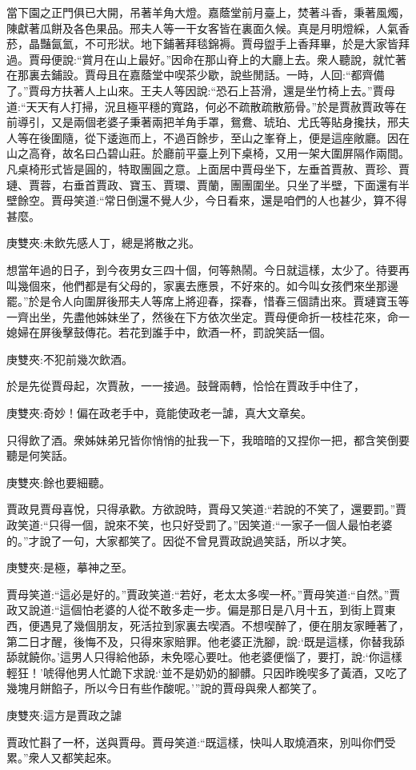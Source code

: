 \begin{parag}
    當下園之正門俱已大開，吊著羊角大燈。嘉蔭堂前月臺上，焚著斗香，秉著風燭，陳獻著瓜餅及各色果品。邢夫人等一干女客皆在裏面久候。真是月明燈綵，人氣香菸，晶豔氤氳，不可形狀。地下鋪著拜毯錦褥。賈母盥手上香拜畢，於是大家皆拜過。賈母便說:“賞月在山上最好。”因命在那山脊上的大廳上去。衆人聽說，就忙著在那裏去鋪設。賈母且在嘉蔭堂中喫茶少歇，說些閒話。一時，人回:“都齊備了。”賈母方扶著人上山來。王夫人等因說:“恐石上苔滑，還是坐竹椅上去。”賈母道:“天天有人打掃，況且極平穩的寬路，何必不疏散疏散筋骨。”於是賈赦賈政等在前導引，又是兩個老婆子秉著兩把羊角手罩，鴛鴦、琥珀、尤氏等貼身攙扶，邢夫人等在後圍隨，從下逶迤而上，不過百餘步，至山之峯脊上，便是這座敞廳。因在山之高脊，故名曰凸碧山莊。於廳前平臺上列下桌椅，又用一架大圍屏隔作兩間。凡桌椅形式皆是圓的，特取團圓之意。上面居中賈母坐下，左垂首賈赦、賈珍、賈璉、賈蓉，右垂首賈政、寶玉、賈環、賈蘭，團團圍坐。只坐了半壁，下面還有半壁餘空。賈母笑道:“常日倒還不覺人少，今日看來，還是咱們的人也甚少，算不得甚麼。\begin{note}庚雙夾:未飲先感人丁，總是將散之兆。\end{note}想當年過的日子，到今夜男女三四十個，何等熱鬧。今日就這樣，太少了。待要再叫幾個來，他們都是有父母的，家裏去應景，不好來的。如今叫女孩們來坐那邊罷。”於是令人向圍屏後邢夫人等席上將迎春，探春，惜春三個請出來。賈璉寶玉等一齊出坐，先盡他姊妹坐了，然後在下方依次坐定。賈母便命折一枝桂花來，命一媳婦在屏後擊鼓傳花。若花到誰手中，飲酒一杯，罰說笑話一個。\begin{note}庚雙夾:不犯前幾次飲酒。\end{note}於是先從賈母起，次賈赦，一一接過。鼓聲兩轉，恰恰在賈政手中住了，\begin{note}庚雙夾:奇妙！偏在政老手中，竟能使政老一謔，真大文章矣。\end{note}只得飲了酒。衆姊妹弟兄皆你悄悄的扯我一下，我暗暗的又捏你一把，都含笑倒要聽是何笑話。\begin{note}庚雙夾:餘也要細聽。\end{note}賈政見賈母喜悅，只得承歡。方欲說時，賈母又笑道:“若說的不笑了，還要罰。”賈政笑道:“只得一個，說來不笑，也只好受罰了。”因笑道:“一家子一個人最怕老婆的。”才說了一句，大家都笑了。因從不曾見賈政說過笑話，所以才笑。\begin{note}庚雙夾:是極，摹神之至。\end{note}賈母笑道:“這必是好的。”賈政笑道:“若好，老太太多喫一杯。”賈母笑道:“自然。”賈政又說道:“這個怕老婆的人從不敢多走一步。偏是那日是八月十五，到街上買東西，便遇見了幾個朋友，死活拉到家裏去喫酒。不想喫醉了，便在朋友家睡著了，第二日才醒，後悔不及，只得來家賠罪。他老婆正洗腳，說:‘既是這樣，你替我舔舔就饒你。’這男人只得給他舔，未免噁心要吐。他老婆便惱了，要打，說:‘你這樣輕狂！’唬得他男人忙跪下求說:‘並不是奶奶的腳髒。只因昨晚喫多了黃酒，又吃了幾塊月餅餡子，所以今日有些作酸呢。’”說的賈母與衆人都笑了。\begin{note}庚雙夾:這方是賈政之謔\end{note}賈政忙斟了一杯，送與賈母。賈母笑道:“既這樣，快叫人取燒酒來，別叫你們受累。”衆人又都笑起來。
\end{parag}


